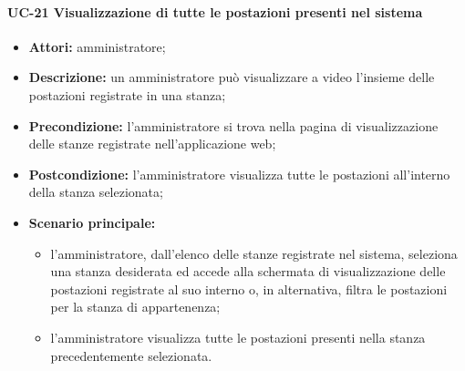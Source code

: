 \paragraph{UC-21 Visualizzazione di tutte le postazioni presenti nel sistema}
\begin{itemize}
    \item \textbf{Attori:} amministratore;
    \item \textbf{Descrizione:} un amministratore pu\`{o} visualizzare a video l'insieme delle postazioni registrate in una stanza;
    \item \textbf{Precondizione:} l'amministratore si trova nella pagina di visualizzazione delle stanze registrate nell'applicazione web;
    \item \textbf{Postcondizione:} l'amministratore visualizza tutte le postazioni all'interno della stanza selezionata;
    \item \textbf{Scenario principale:}
    \begin{itemize}
        \item l'amministratore, dall'elenco delle stanze registrate nel sistema, seleziona una stanza desiderata ed accede alla schermata di visualizzazione delle postazioni registrate al suo interno o, in alternativa, filtra le postazioni per la stanza di appartenenza;
        \item l'amministratore visualizza tutte le postazioni presenti nella stanza precedentemente selezionata.
    \end{itemize}
\end{itemize}

